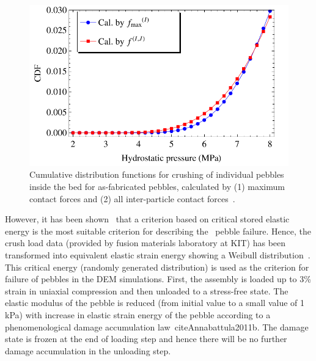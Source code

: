 \begin{figure}[!ht]
  \centering
\includegraphics[width=\singleimagewidth]{figures/Fig-4}
 \caption{Cumulative distribution functions for crushing of individual pebbles inside the bed for as-fabricated pebbles, calculated by (1) maximum contact forces and (2) all inter-particle contact forces~\cite{Gan:2010kc}.}
 \label{fig:cdf_pebbles}
\end{figure}

However, it has been shown~\cite{Zhao2010,Zhao2011} that a criterion based on critical stored elastic energy is the most suitable criterion for describing the \lis~pebble failure. Hence, the crush load data (provided by fusion materials laboratory at KIT) has been transformed into equivalent elastic strain energy showing a Weibull distribution~\cite{Zhao2010}. This critical energy (randomly generated distribution) is used as the criterion for failure of pebbles in the DEM simulations. First, the assembly is loaded up to 3\% strain in uniaxial compression and then unloaded to a stress-free state. The elastic modulus of the pebble is reduced (from initial value to a small value of 1 kPa) with increase in elastic strain energy of the pebble according to a phenomenological damage accumulation law~cite{Annabattula2011b}. The damage state is frozen at the end of loading step and hence there will be no further damage accumulation in the unloading step. 

